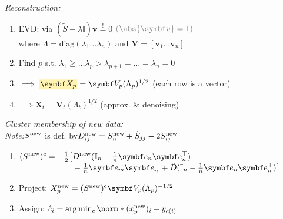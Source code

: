 \emph{Reconstruction:}\\
\begin{enumerate}
    \item EVD:
        \enskip {}
        \enskip via \enskip $(\tilde S - \lambda \mathbb I) \symbf v \overset!= 0$
        \enskip $\color{gray} (\abs{\symbf v} = 1)$\\
        where \: $\Lambda {=} \mathrm{diag}(\lambda_1 \ldots \lambda_n)$
        \: and \: $\symbf V {=} [\symbf v_1 \ldots \symbf v_n]$
    \item Find $p$ s.t. $\lambda_1 \geq \ldots \lambda_p > \lambda_{p+1} = \ldots = \lambda_n = 0$
    \item $\implies \highlight*{\symbf X_p} = \symbf V_p (\Lambda_p)^{1/2}$
        \enskip (each row is a vector)
    \item $\implies \symbf X_t = \symbf V_t (\Lambda_t)^{1/2}$
        \enskip (approx. \& denoising)
\end{enumerate}

\columnbreak
\emph{Cluster membership of new data:}\\
\textit{Note:}\enspace $S^\mathrm{new}$ is def. by\enspace $D_{ij}^\mathrm{new} = S_{ii}^\mathrm{new} + \tilde S_{jj} - 2 S_{ij}^\mathrm{new}$
\begin{enumerate}
    \item $\begin{aligned}[t]
        (S\ap{new})\ap{c} = -\tfrac12 \big[ &
            D\ap{new} (\mathbb I_n - \tfrac1n \symbf e_n \symbf e_n^\top)
        \\[-3pt] &
            - \tfrac1n \symbf e_m \symbf e_n^\top + \tilde D (\mathbb I_n - \tfrac1n \symbf e_n \symbf e_n^\top) \big]
    \end{aligned}$
    \item Project:
        \enspace $X_p\ap{new} = (S\ap{new})\ap{c} \symbf V_p (\Lambda_p)^{-1/2}$
    \item Assign:
        \enskip $\hat c_i = \arg\min_c \norm*{(x_p\ap{new})_i - y_{c(i)}}$
\end{enumerate}

